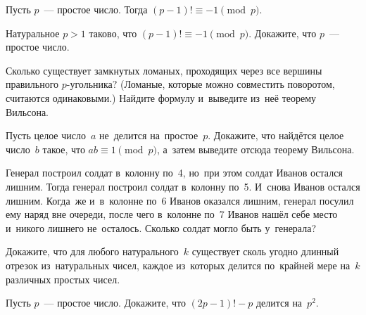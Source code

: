 Пусть $p$~--- простое число.
Тогда $(p - 1)! \equiv -1 \pmod{p}$.

Натуральное $p > 1$ таково, что $(p - 1)! \equiv -1 \pmod{p}$.
Докажите, что $p$~--- простое число.

\begin{problems}

\item
Сколько существует замкнутых ломаных, проходящих через все вершины правильного
$p$-угольника?
(Ломаные, которые можно совместить поворотом, считаются одинаковыми.)
Найдите формулу и~выведите из~неё теорему Вильсона.

\item
Пусть целое число~$a$ не~делится на~простое~$p$.
Докажите, что найдётся целое число~$b$ такое, что $a b \equiv 1 \pmod{p}$,
а~затем выведите отсюда теорему Вильсона.

\item
Генерал построил солдат в~колонну по~4, но~при этом солдат Иванов остался
лишним.
Тогда генерал построил солдат в~колонну по~5.
И~снова Иванов остался лишним.
Когда~же и~в~колонне по~6 Иванов оказался лишним, генерал посулил ему наряд вне
очереди, после чего в~колонне по~7 Иванов нашёл себе место и~никого лишнего
не~осталось.
Сколько солдат могло быть у~генерала?

\item
Докажите, что для любого натурального~$k$ существует сколь угодно длинный
отрезок из~натуральных чисел, каждое из~которых делится по~крайней мере на~$k$
различных простых чисел.

\item
Пусть $p$~--- простое число.
Докажите, что $(2 p - 1)! - p$ делится на~$p^2$.

\end{problems}

\endgroup %

